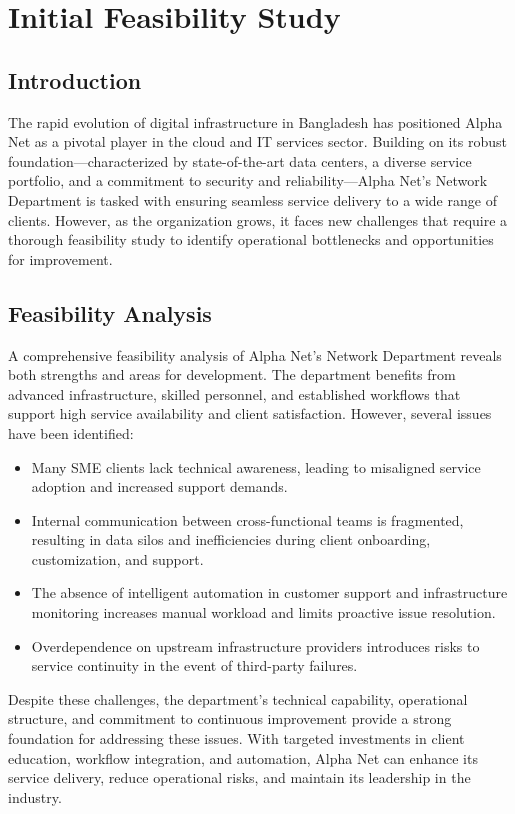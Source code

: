 
\chapter{Initial Feasibility Study}

\section{Introduction}
The rapid evolution of digital infrastructure in Bangladesh has positioned Alpha Net as a pivotal player in the cloud and IT services sector. Building on its robust foundation—characterized by state-of-the-art data centers, a diverse service portfolio, and a commitment to security and reliability—Alpha Net's Network Department is tasked with ensuring seamless service delivery to a wide range of clients. However, as the organization grows, it faces new challenges that require a thorough feasibility study to identify operational bottlenecks and opportunities for improvement.

\section{Feasibility Analysis}
A comprehensive feasibility analysis of Alpha Net's Network Department reveals both strengths and areas for development. The department benefits from advanced infrastructure, skilled personnel, and established workflows that support high service availability and client satisfaction. However, several issues have been identified:
\begin{itemize}
    \item Many SME clients lack technical awareness, leading to misaligned service adoption and increased support demands.
    \item Internal communication between cross-functional teams is fragmented, resulting in data silos and inefficiencies during client onboarding, customization, and support.
    \item The absence of intelligent automation in customer support and infrastructure monitoring increases manual workload and limits proactive issue resolution.
    \item Overdependence on upstream infrastructure providers introduces risks to service continuity in the event of third-party failures.
\end{itemize}
Despite these challenges, the department's technical capability, operational structure, and commitment to continuous improvement provide a strong foundation for addressing these issues. With targeted investments in client education, workflow integration, and automation, Alpha Net can enhance its service delivery, reduce operational risks, and maintain its leadership in the industry.

